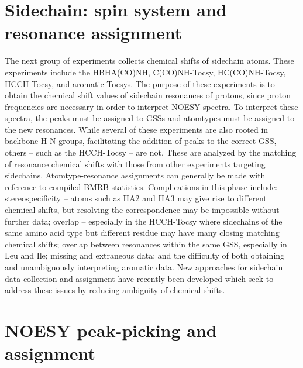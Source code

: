 \section{Sidechain: spin system and resonance assignment}

The next group of experiments collects chemical shifts of sidechain atoms.  
These experiments include the HBHA(CO)NH, C(CO)NH-Tocsy, HC(CO)NH-Tocsy, 
HCCH-Tocsy, and aromatic Tocsys.  The purpose of these experiments is to 
obtain the chemical shift values of sidechain resonances of protons, since 
proton frequencies are necessary in order to interpret NOESY spectra.  To 
interpret these spectra, the peaks must be assigned to GSSs and atomtypes 
must be assigned to the new resonances. While several of these experiments 
are also rooted in backbone H-N groups, facilitating the addition of peaks 
to the correct GSS, others -- such as the HCCH-Tocsy -- are not.  These are 
analyzed by the matching of resonance chemical shifts with those from other 
experiments targeting sidechains.  Atomtype-resonance assignments can generally 
be made with reference to compiled BMRB statistics.  Complications in this 
phase include: stereospecificity -- atoms such as HA2 and HA3 may give rise 
to different chemical shifts, but resolving the correspondence may be 
impossible without further data; overlap -- especially in the HCCH-Tocsy 
where sidechains of the same amino acid type but different residue may have 
many closing matching chemical shifts; overlap between resonances within the 
same GSS, especially in Leu and Ile; missing and extraneous data; and the 
difficulty of both obtaining and unambiguously interpreting aromatic data.  
New approaches for sidechain data collection and assignment have recently 
been developed \cite{mobli2010non, hiller2008apsy} which seek to address 
these issues by reducing ambiguity of chemical shifts.


\section{NOESY peak-picking and assignment}

